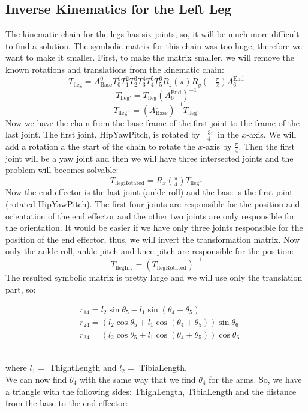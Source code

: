 \subsection{Inverse Kinematics for the Left Leg}
The kinematic chain for the legs has six joints, so, it will be much more difficult to find a solution. The symbolic matrix for this chain was too huge, therefore we want to make it smaller. First, to make the matrix smaller, we will remove the known rotations and translations from the kinematic chain:
\[
T_{\text{lleg}} = A^0_\text{Base}T^1_0T^2_1T^3_2T^4_3T^5_4T^6_5R_z(\pi)R_y(-\tfrac{\pi}{2})A^\text{End}_6
\]
\[
T_{\text{lleg}'} = T_\text{lleg}{\left(A^\text{End}_6\right)}^{-1}
\]
\[
T_{\text{lleg}''} = {\left(A^0_\text{Base}\right)}^{-1}T_{\text{lleg}'}
\]
Now we have the chain from the base frame of the first joint to the frame of the last joint. The first joint, HipYawPitch, is rotated by $ \frac{-3\pi}{4} $ in the $ x $-axis. We will add a rotation a the start of the chain to rotate the $x$-axis by $\frac{\pi}{4}$. Then the first joint will be a yaw joint and then we will have three intersected joints and the problem will becomes solvable:
\[
T_\text{llegRotated} = R_x(\tfrac{\pi}{4})T_{\text{lleg}''}
\]
Now the end effector is the last joint (ankle roll) and the base is the first joint (rotated HipYawPitch). The first four joints are responsible for the position and orientation of the end effector and the other two joints are only responsible for the orientation. It would be easier if we have only three joints responsible for the position of the end effector, thus, we will invert the transformation matrix. Now only the ankle roll, ankle pitch and knee pitch are responsible for the position:
\[
T_\text{llegInv} = {\left(T_\text{llegRotated}\right)}^{-1}
\]
The resulted symbolic matrix is pretty large and we will use only the translation part, so:
\begin{small}
\begin{align*}
&r_{14} = l_2\sin\theta_5 - l_1\sin\left(\theta_4 + \theta_5\right)\\
&r_{24} = \left(l_2\cos\theta_5 + l_1 \cos\left(\theta_4 + \theta_5\right)\right)\sin\theta_6\\
&r_{34} = \left(l_2\cos\theta_5 + l_1 \cos\left(\theta_4 + \theta_5\right)\right)\cos\theta_6
\end{align*}
\end{small}\\
where $l_1 =$ ThightLength and $l_2 =$ TibiaLength.\\
We can now find $\theta_4$ with the same way that we find $\theta_4$ for the arms. So, we have a triangle with the following sides: ThighLength, TibiaLength and the distance from the base to the end effector:
